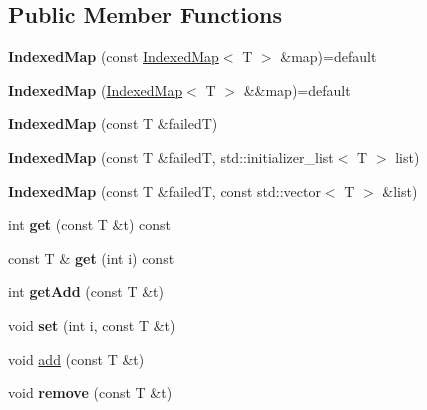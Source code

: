 \subsection*{Public Member Functions}
\begin{DoxyCompactItemize}
\item 
\mbox{\label{classx2_1_1_indexed_map_a0ae7462f1bfbc8145fa992cc0bfaa923}} 
{\bfseries Indexed\+Map} (const \hyperlink{classx2_1_1_indexed_map}{Indexed\+Map}$<$ T $>$ \&map)=default
\item 
\mbox{\label{classx2_1_1_indexed_map_ae77e782d05e1f99e84be949f0834c710}} 
{\bfseries Indexed\+Map} (\hyperlink{classx2_1_1_indexed_map}{Indexed\+Map}$<$ T $>$ \&\&map)=default
\item 
\mbox{\label{classx2_1_1_indexed_map_aaab5c1c5eb826a61725e8527f8ad3aa0}} 
{\bfseries Indexed\+Map} (const T \&failedT)
\item 
\mbox{\label{classx2_1_1_indexed_map_a8973ed906cd8d78344139765cb8fe0c0}} 
{\bfseries Indexed\+Map} (const T \&failedT, std\+::initializer\+\_\+list$<$ T $>$ list)
\item 
\mbox{\label{classx2_1_1_indexed_map_a8a13faf490943dc5b95bb55c90174aa1}} 
{\bfseries Indexed\+Map} (const T \&failedT, const std\+::vector$<$ T $>$ \&list)
\item 
\mbox{\label{classx2_1_1_indexed_map_a953add6e946eccbe53a8cfb817ea06c7}} 
int {\bfseries get} (const T \&t) const
\item 
\mbox{\label{classx2_1_1_indexed_map_aaddb767a7970a551177b8d8198603ac8}} 
const T \& {\bfseries get} (int i) const
\item 
\mbox{\label{classx2_1_1_indexed_map_aa95f0065873bed75257da67c3111f75c}} 
int {\bfseries get\+Add} (const T \&t)
\item 
\mbox{\label{classx2_1_1_indexed_map_a8841875de3bb775a698377b5cb160fdd}} 
void {\bfseries set} (int i, const T \&t)
\item 
void \hyperlink{classx2_1_1_indexed_map_a76211a5e565fd668c39f00f2935d6481}{add} (const T \&t)
\item 
\mbox{\label{classx2_1_1_indexed_map_a15516e7f6557faff0697a7ae9ce95e2a}} 
void {\bfseries remove} (const T \&t)
\end{DoxyCompactItemize}
